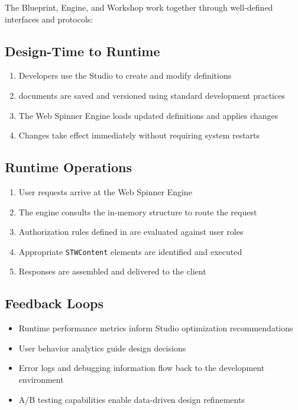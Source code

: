 The Blueprint, Engine, and Workshop work together through well-defined interfaces and protocols:

\subsection{Design-Time to Runtime}

\begin{enumerate}
	\item Developers use the Studio to create and modify \webbase{} definitions
	\item \wbdl{} documents are saved and versioned using standard development practices
	\item The Web Spinner Engine loads updated \webbase{} definitions and applies changes
	\item Changes take effect immediately without requiring system restarts
\end{enumerate}

\subsection{Runtime Operations}

\begin{enumerate}
	\item User requests arrive at the Web Spinner Engine
	\item The engine consults the in-memory \webbase{} structure to route the request
	\item Authorization rules defined in \wbdl{} are evaluated against user roles
	\item Appropriate \texttt{STWContent} elements are identified and executed
	\item Responses are assembled and delivered to the client
\end{enumerate}

\subsection{Feedback Loops}

\begin{itemize}
	\item Runtime performance metrics inform Studio optimization recommendations
	\item User behavior analytics guide design decisions
	\item Error logs and debugging information flow back to the development environment
	\item A/B testing capabilities enable data-driven design refinements
\end{itemize}

